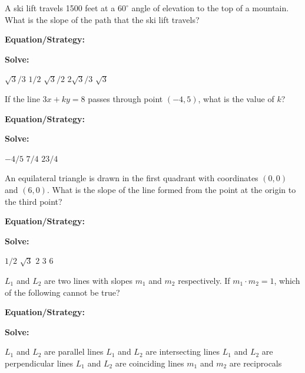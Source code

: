 \vfill
\newpage
\begin{multicols*}{2}
\begin{outline}[enumerate]
\medium

\1 A ski lift travels 1500 feet at a $60^\circ$ angle of elevation to the top of a mountain. What is the slope of the path that the ski lift travels?

\bigskip
\textbf{Equation/Strategy:} \hrulefill

\bigskip
\textbf{Solve:}

\vfill
\2 $\sqrt3/3$
\2 $1/2$
\2 $\sqrt3/2$
\2 $2\sqrt3/3$
\2 $\sqrt3$

\midline

\1 If the line $3x+ky=8$ passes through point $(-4,5)$, what is the value of $k$?

\bigskip
\textbf{Equation/Strategy:} \hrulefill

\bigskip
\textbf{Solve:}

\vfill
\2 $-4/5$
\2 $7/4$
\2 $23/4$

\columnbreak
\advanced

\1 An equilateral triangle is drawn in the first quadrant with coordinates $(0,0)$ and $(6,0)$. What is the slope of the line formed from the point at the origin to the third point?

\bigskip
\textbf{Equation/Strategy:} \hrulefill

\bigskip
\textbf{Solve:}

\vfill
\2 $1/2$
\2 $\sqrt3$
\2 $2$
\2 $3$
\2 $6$

\midline

\1 $L_1$ and $L_2$ are two lines with slopes  $m_1$ and $m_2$ respectively. If $m_1\cdot m_2=1$, which of the following cannot be true?

\bigskip
\textbf{Equation/Strategy:}

\bigskip
\textbf{Solve:}

\vfill
\2 $L_1$ and $L_2$ are parallel lines
\2 $L_1$ and $L_2$ are intersecting lines
\2 $L_1$ and $L_2$ are perpendicular lines
\2 $L_1$ and $L_2$ are coinciding lines
\2 $m_1$ and $m_2$ are reciprocals
\end{outline}
\end{multicols*}